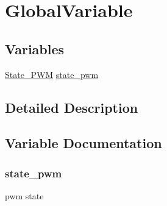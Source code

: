 \hypertarget{group__beacon_signal___global_variable}{\section{Global\+Variable}
\label{group__beacon_signal___global_variable}
}
\subsection*{Variables}
\begin{DoxyCompactItemize}
\item 
\hyperlink{group__beacon_signal___enum_gaf07d5c78df9960e7668bdf1033ba45e1}{State\+\_\+\+P\+W\+M} \hyperlink{group__beacon_signal___global_variable_gaed2cd5a4ec823d5dea1374f445523e3f}{state\+\_\+pwm}
\end{DoxyCompactItemize}


\subsection{Detailed Description}


\subsection{Variable Documentation}
\hypertarget{group__beacon_signal___global_variable_gaed2cd5a4ec823d5dea1374f445523e3f}{
\subsubsection[{state\+\_\+pwm}]{ state\+\_\+pwm}}\label{group__beacon_signal___global_variable_gaed2cd5a4ec823d5dea1374f445523e3f}
pwm state 